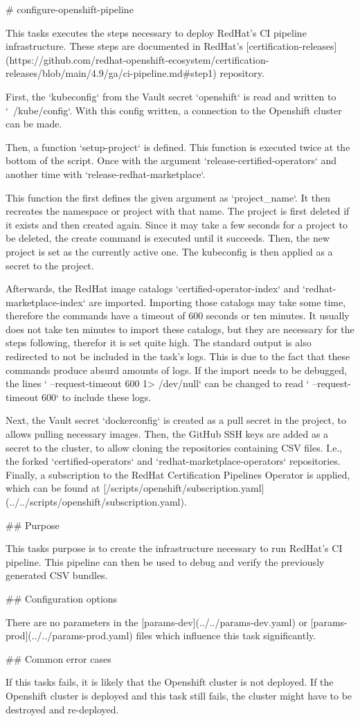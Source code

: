 # configure-openshift-pipeline

This tasks executes the steps necessary to deploy RedHat's CI pipeline infrastructure.
These steps are documented in RedHat's [certification-releases](https://github.com/redhat-openshift-ecosystem/certification-releases/blob/main/4.9/ga/ci-pipeline.md#step1) repository.

First, the `kubeconfig` from the Vault secret `openshift` is read and written to `~/kube/config`.
With this config written, a connection to the Openshift cluster can be made.

Then, a function `setup-project` is defined.
This function is executed twice at the bottom of the script.
Once with the argument `release-certified-operators` and another time with `release-redhat-marketplace`.

This function the first defines the given argument as `project_name`.
It then recreates the namespace or project with that name.
The project is first deleted if it exists and then created again.
Since it may take a few seconds for a project to be deleted, the create command is executed until it succeeds.
Then, the new project is set as the currently active one.
The kubeconfig is then applied as a secret to the project.

Afterwards, the RedHat image catalogs `certified-operator-index` and `redhat-marketplace-index` are imported.
Importing those catalogs may take some time, therefore the commands have a timeout of 600 seconds or ten minutes.
It usually does not take ten minutes to import these catalogs, but they are necessary for the steps following, therefor it is set quite high.
The standard output is also redirected to not be included in the task's logs.
This is due to the fact that these commands produce absurd amounts of logs.
If the import needs to be debugged, the lines `    --request-timeout 600 1> /dev/null` can be changed to read `    --request-timeout 600` to include these logs.

Next, the Vault secret `dockerconfig` is created as a pull secret in the project, to allows pulling necessary images.
Then, the GitHub SSH keys are added as a secret to the cluster, to allow cloning the repositories containing CSV files.
I.e., the forked `certified-operators` and `redhat-marketplace-operators` repositories.
Finally, a subscription to the RedHat Certification Pipelines Operator is applied, which can be found at [/scripts/openshift/subscription.yaml](../../scripts/openshift/subscription.yaml).

## Purpose

This tasks purpose is to create the infrastructure necessary to run RedHat's CI pipeline.
This pipeline can then be used to debug and verify the previously generated CSV bundles.

## Configuration options

There are no parameters in the [params-dev](../../params-dev.yaml) or [params-prod](../../params-prod.yaml) files which influence this task significantly.

## Common error cases

If this tasks fails, it is likely that the Openshift cluster is not deployed.
If the Openshift cluster is deployed and this task still fails, the cluster might have to be destroyed and re-deployed.
